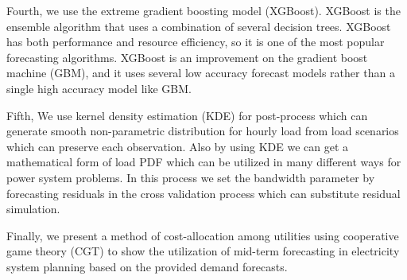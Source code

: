 \documentclass[journal]{IEEEtran} %
\begin{document}
Fourth, we use the extreme gradient boosting model (XGBoost). XGBoost is the ensemble algorithm that uses a combination of several decision trees. XGBoost has both performance and resource efficiency, so it is one of the most popular forecasting algorithms. XGBoost is an improvement on the gradient boost machine (GBM), and it uses several low accuracy forecast models rather than a single high accuracy model like GBM.   

Fifth, We use kernel density estimation (KDE) for post-process which can generate smooth non-parametric distribution for hourly load from load scenarios which can preserve each observation. Also by using KDE we can get a mathematical form of load PDF which can be utilized in many different ways for power system problems. In this process we set the bandwidth parameter by forecasting residuals in the cross validation process which can substitute residual simulation.

Finally, we present a method of cost-allocation among utilities using cooperative game theory (CGT) to show the utilization of mid-term forecasting in electricity system planning based on the provided demand forecasts.
 

\end{document}
